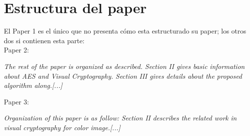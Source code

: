 \documentclass[a4paper,12pt]{article}
\begin{document}
\section{Estructura del paper}

El Paper 1 es el único que no presenta cómo esta estructurado su paper; los otros dos si contienen esta parte:\\
Paper 2:\par
\textit{The rest of the paper is organized as described. Section II
gives basic information about AES and Visual Cryptography.
Section III gives details about the proposed algorithm along.[...]} \par

Paper 3:\par
\textit{Organization of this paper is as follow: Section II
describes the related work in visual cryptography for color
image.[...]}
\end{document}
